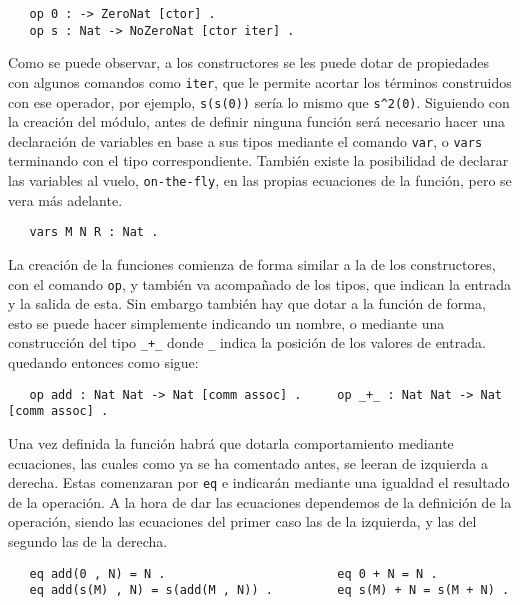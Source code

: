 {\codesize
\begin{verbatim}
   op 0 : -> ZeroNat [ctor] .
   op s : Nat -> NoZeroNat [ctor iter] .
\end{verbatim}
}

Como se puede observar, a los constructores se les puede dotar de propiedades con algunos comandos como \texttt{iter}, que le permite acortar los términos construidos con ese operador, por ejemplo, \verb"s(s(0))" sería lo mismo que \verb"s^2(0)". Siguiendo con la creación del módulo, antes de definir ninguna función será necesario hacer una declaración de variables en base a sus tipos mediante el comando \texttt{var}, o \texttt{vars} terminando con el tipo correspondiente. También existe la posibilidad de declarar las variables al vuelo, \texttt{on-the-fly}, en las propias ecuaciones de la función, pero se vera más adelante. \par

{\codesize
\begin{verbatim}
   vars M N R : Nat .
\end{verbatim}
}

La creación de la funciones comienza de forma similar a la de los constructores, con el comando \texttt{op}, y también va acompañado de los tipos, que indican la entrada y la salida de esta. Sin embargo también hay que dotar a la función de forma, esto se puede hacer simplemente indicando un nombre, o mediante una construcción del tipo \verb"_+_" donde \verb"_" indica la posición de los valores de entrada. quedando entonces como sigue: \par

{\codesize
\begin{verbatim}
   op add : Nat Nat -> Nat [comm assoc] .     op _+_ : Nat Nat -> Nat [comm assoc] .
\end{verbatim}
}

Una vez definida la función habrá que dotarla comportamiento mediante ecuaciones, las cuales como ya se ha comentado antes, se leeran de izquierda a derecha. Estas comenzaran por \texttt{eq} e indicarán mediante una igualdad el resultado de la operación. A la hora de dar las ecuaciones dependemos de la definición de la operación, siendo las ecuaciones del primer caso las de la izquierda, y las del segundo las de la derecha. \par
{\codesize
\begin{verbatim}
   eq add(0 , N) = N .                        eq 0 + N = N .
   eq add(s(M) , N) = s(add(M , N)) .         eq s(M) + N = s(M + N) .
\end{verbatim}
}

